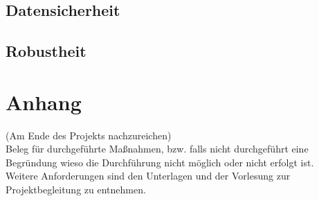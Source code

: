 \documentclass[accentcolor=tud0b,12pt,paper=a4]{tudreport}
\begin{document}
                \newpage
    \section{Datensicherheit}

    \section{Robustheit}

\appendix
  \chapter{Anhang}
    (Am Ende des Projekts nachzureichen)\\
    Beleg für durchgeführte Maßnahmen, bzw. falls nicht durchgeführt eine Begründung wieso die Durchführung nicht möglich oder nicht erfolgt ist. \\
    Weitere Anforderungen sind den Unterlagen und der Vorlesung zur Projektbegleitung zu entnehmen.
\end{document}
